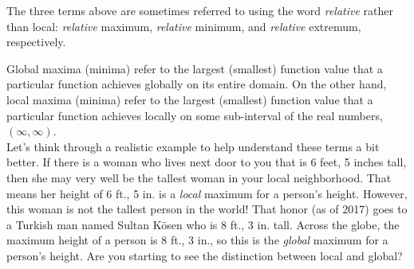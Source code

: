 \documentclass{ximera}
\begin{document}
\begin{warning}
The three terms above are sometimes referred to using the word \textit{relative} rather than local: \textit{relative} maximum, \textit{relative} minimum, and \textit{relative} extremum, respectively.
\end{warning}

\begin{example}
Global maxima (minima) refer to the largest (smallest) function value that a particular function achieves globally on its entire domain.  On the other hand, local maxima (minima) refer to the largest (smallest) function value that a particular function achieves locally on some sub-interval of the real numbers, $(\infty, \infty)$.  \\

Let's think through a realistic example to help understand these terms a bit better.  If there is a woman who lives next door to you that is 6 feet, 5 inches tall, then she may very well be the tallest woman in your local neighborhood.  That means her height of 6 ft., 5 in. is a \textit{local} maximum for a person's height.  However, this woman is not the tallest person in the world!  That honor (as of 2017) goes to a Turkish man named Sultan K{\"o}sen who is 8 ft., 3 in. tall.  Across the globe, the maximum height of a person is 8 ft., 3 in., so this is the \textit{global} maximum for a person's height.  Are you starting to see the distinction between local and global?  

\end{example}
\end{document}
